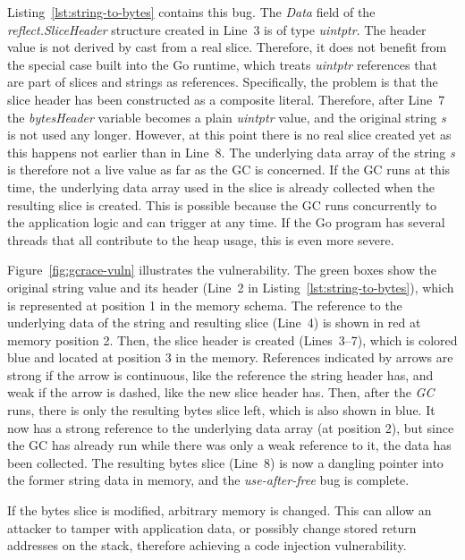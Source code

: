 Listing~\ref{lst:string-to-bytes} contains this bug.
The \textit{Data} field of the \textit{reflect.SliceHeader} structure created in Line~3 is of type \textit{uintptr}.
The header value is not derived by cast from a real slice.
Therefore, it does not benefit from the special case built into the Go runtime, which treats \textit{uintptr} references
that are part of slices and strings as references.
Specifically, the problem is that the slice header has been constructed as a composite literal.
Therefore, after Line~7 the \textit{bytesHeader} variable becomes a plain \textit{uintptr} value, and the
original string \textit{s} is not used any longer.
However, at this point there is no real slice created yet as this happens not earlier than in Line~8.
The underlying data array of the string \textit{s} is therefore not a live value as far as the \acrshort{GC} is
concerned.
If the \acrshort{GC} runs at this time, the underlying data array used in the slice is already collected when the
resulting slice is created.
This is possible because the \acrshort{GC} runs concurrently to the application logic and can trigger at any time.
If the Go program has several threads that all contribute to the heap usage, this is even more severe.



Figure~\ref{fig:gcrace-vuln} illustrates the vulnerability.
The green boxes show the original string value and its header (Line~2 in Listing~\ref{lst:string-to-bytes}), which is
represented at position 1 in the memory schema.
The reference to the underlying data of the string and resulting slice (Line~4) is shown in red at memory position 2.
Then, the slice header is created (Lines~3--7), which is colored blue and located at position 3 in the memory.
References indicated by arrows are strong if the arrow is continuous, like the reference the string header has, and
weak if the arrow is dashed, like the new slice header has.
Then, after the \textit{GC} runs, there is only the resulting bytes slice left, which is also shown in blue.
It now has a strong reference to the underlying data array (at position 2), but since the \acrshort{GC} has already run
while there was only a weak reference to it, the data has been collected.
The resulting bytes slice (Line~8) is now a dangling pointer into the former string data in memory, and the
\textit{use-after-free} bug is complete.

If the bytes slice is modified, arbitrary memory is changed.
This can allow an attacker to tamper with application data, or possibly change stored return addresses on the stack,
therefore achieving a code injection vulnerability.


